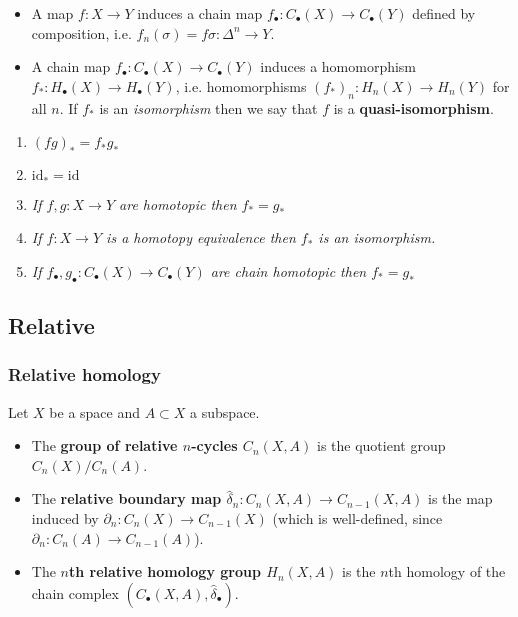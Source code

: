 \documentclass[10pt]{article}
\newcommand{\id}{\mathrm{id}}
\begin{document}
            \begin{itemize}
                \item A map $f\colon X\to Y$ induces a chain map $f_\bullet\colon C_\bullet(X)\to C_\bullet(Y)$ defined by composition, i.e. $f_n(\sigma)=f\sigma\colon\Delta^n\to Y$.
                \item A chain map $f_\bullet\colon C_\bullet(X)\to C_\bullet(Y)$ induces a homomorphism $f_*\colon H_\bullet(X)\to H_\bullet(Y)$, i.e. homomorphisms $(f_*)_n\colon H_n(X)\to H_n(Y)$ for all $n$.
                    If $f_*$ is an \emph{isomorphism} then we say that $f$ is a \textbf{quasi-isomorphism}.
            \end{itemize}

            \begin{enumerate}
                \item $(fg)_*=f_*g_*$
                \item $\id_*=\id$
                \item \emph{If $f,g\colon X\to Y$ are homotopic then $f_*=g_*$}
                \item \emph{If $f\colon X\to Y$ is a homotopy equivalence then $f_*$ is an isomorphism.}
                \item \emph{If $f_\bullet,g_\bullet\colon C_\bullet(X)\to C_\bullet(Y)$ are chain homotopic then $f_*=g_*$}
            \end{enumerate}

        \subsection{Relative}

            \subsubsection{Relative homology}

                Let $X$ be a space and $A\subset X$ a subspace.

                \begin{itemize}
                    \item The \textbf{group of relative $n$-cycles $C_n(X,A)$} is the quotient group $C_n(X)/C_n(A)$.
                    \item The \textbf{relative boundary map $\hat{\delta}_n\colon C_n(X,A)\to C_{n-1}(X,A)$} is the map induced by $\partial_n\colon C_n(X)\to C_{n-1}(X)$ (which is well-defined, since $\partial_n\colon C_n(A)\to C_{n-1}(A)$).
                    \item The \textbf{$n$th relative homology group $H_n(X,A)$} is the $n$th homology of the chain complex $(C_\bullet(X,A),\hat{\delta}_\bullet)$.
                \end{itemize}
\end{document}
